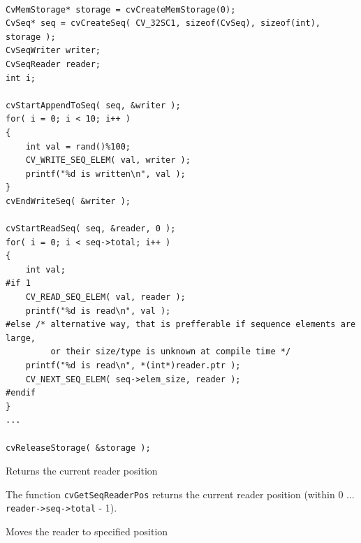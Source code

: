 \begin{lstlisting}

CvMemStorage* storage = cvCreateMemStorage(0);
CvSeq* seq = cvCreateSeq( CV_32SC1, sizeof(CvSeq), sizeof(int), storage );
CvSeqWriter writer;
CvSeqReader reader;
int i;

cvStartAppendToSeq( seq, &writer );
for( i = 0; i < 10; i++ )
{
    int val = rand()%100;
    CV_WRITE_SEQ_ELEM( val, writer );
    printf("%d is written\n", val );
}
cvEndWriteSeq( &writer );

cvStartReadSeq( seq, &reader, 0 );
for( i = 0; i < seq->total; i++ )
{
    int val;
#if 1
    CV_READ_SEQ_ELEM( val, reader );
    printf("%d is read\n", val );
#else /* alternative way, that is prefferable if sequence elements are large,
         or their size/type is unknown at compile time */
    printf("%d is read\n", *(int*)reader.ptr );
    CV_NEXT_SEQ_ELEM( seq->elem_size, reader );
#endif
}
...

cvReleaseStorage( &storage );

\end{lstlisting}

\label{GetSeqReaderPos}

Returns the current reader position


\begin{description}
\end{description}


The function \texttt{cvGetSeqReaderPos} returns the current reader position (within 0 ... \texttt{reader->seq->total} - 1).

\label{SetSeqReaderPos}

Moves the reader to specified position


\begin{description}
\end{description}

